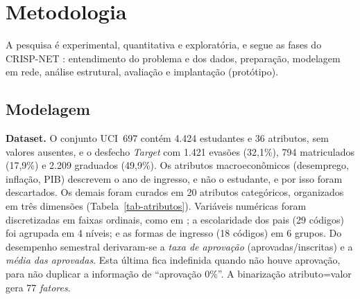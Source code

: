 \section{Metodologia}
\label{metodologia}

A pesquisa é experimental, quantitativa e exploratória, e segue as fases do CRISP-NET \citep{acuna2025}: entendimento do problema e dos dados, preparação, modelagem em rede, análise estrutural, avaliação e implantação (protótipo).

\subsection{Modelagem}
\label{ssec:modelagem}

\textbf{Dataset.} O conjunto UCI~697 \citep{realinho2022} contém 4.424 estudantes e 36 atributos, sem valores ausentes, e o desfecho \textit{Target} com 1.421 evasões (32{,}1\%), 794 matriculados (17{,}9\%) e 2.209 graduados (49{,}9\%). Os atributos macroeconômicos (desemprego, inflação, PIB) descrevem o ano de ingresso, e não o estudante, e por isso foram descartados. Os demais foram curados em 20 atributos categóricos, organizados em três dimensões (Tabela~\ref{tab-atributos}). Variáveis numéricas foram discretizadas em faixas ordinais, como em \citet{porto2025}; a escolaridade dos pais (29 códigos) foi agrupada em 4 níveis; e as formas de ingresso (18 códigos) em 6 grupos. Do desempenho semestral derivaram-se a \textit{taxa de aprovação} (aprovadas/inscritas) e a \textit{média das aprovadas}. Esta última fica indefinida quando não houve aprovação, para não duplicar a informação de ``aprovação 0\%''. A binarização atributo=valor gera 77 \textit{fatores}.

